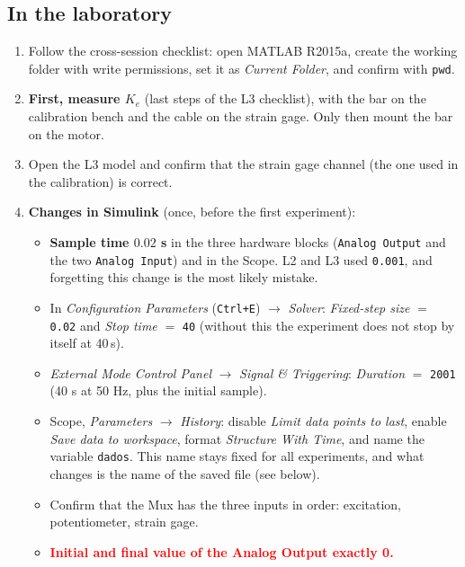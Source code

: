 \documentclass[a4paper,11pt]{article}
\begin{document}
\subsection*{In the laboratory}

\begin{enumerate}[label=$\square$, leftmargin=1.5em]
  \item Follow the cross-session checklist: open MATLAB R2015a, create the working folder with write permissions, set it as \emph{Current Folder}, and confirm with \texttt{pwd}.

  \item \textbf{First, measure $K_e$} (last steps of the L3 checklist), with the bar on the calibration bench and the cable on the strain gage.
  Only then mount the bar on the motor.

  \item Open the L3 model and confirm that the strain gage channel (the one used in the calibration) is correct.

  \item \textbf{Changes in Simulink} (once, before the first experiment):
  \begin{itemize}
    \item \textbf{Sample time $0.02$ s} in the three hardware blocks (\texttt{Analog Output} and the two \texttt{Analog Input}) and in the Scope.
    L2 and L3 used \texttt{0.001}, and forgetting this change is the most likely mistake.
    \item In \emph{Configuration Parameters} (\texttt{Ctrl+E}) $\to$ \emph{Solver}: \emph{Fixed-step size} $=$ \texttt{0.02} and \emph{Stop time} $=$ \texttt{40} (without this the experiment does not stop by itself at 40\,s).
    \item \emph{External Mode Control Panel} $\to$ \emph{Signal \& Triggering}: \emph{Duration} $=$ \texttt{2001} (40 s at 50 Hz, plus the initial sample).
    \item Scope, \emph{Parameters} $\to$ \emph{History}: disable \emph{Limit data points to last}, enable \emph{Save data to workspace}, format \emph{Structure With Time}, and name the variable \texttt{dados}.
    This name stays fixed for all experiments, and what changes is the name of the saved file (see below).
    \item Confirm that the Mux has the three inputs in order: excitation, potentiometer, strain gage.
    \item \textcolor{red}{\textbf{Initial and final value of the Analog Output exactly 0.}}
  \end{itemize}


\end{enumerate}
\end{document}

